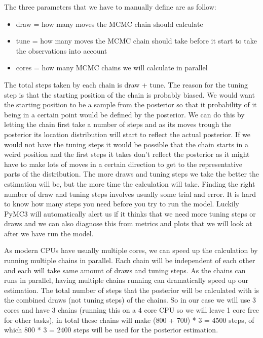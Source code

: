 \documentclass[12pt,a4paper,leqno]{report}
\theoremstyle{plain}
\theoremstyle{definition}
\theoremstyle{remark}
\begin{document}
The three parameters that we have to manually define are as follow:

\begin{itemize}
    \item draw = how many moves the MCMC chain should calculate
    \item tune = how many moves the MCMC chain should take before it start to
    take the observations into account
    \item cores = how many MCMC chains we will calculate in parallel
\end{itemize}

The total steps taken by each chain is draw + tune. The reason for the tuning step is
that the starting position of the chain is probably biased. We would want the starting
position to be a sample from the posterior so that it probability of it being in a certain
point would be defined by the posterior. We can do this by letting the chain first take
a number of steps and as its moves trough the posterior its location distribution will start to
reflect the actual posterior. If we would not have the tuning steps it would be possible
that the chain starts in a weird position and the first steps it takes don't reflect the
posterior as it might have to make lots of moves in a certain direction to get to the
representative parts of the distribution. The more draws and tuning steps we take the
better the estimation will be, but the more time the calculation will take. Finding the
right number of draw and tuning steps involves usually some trial and error. It is
hard to know how many steps you need before you try to run the model. Luckily PyMC3 will
automatically alert us if it thinks that we need more tuning steps or draws and we can
also diagnose this from metrics and plots that we will look at after we have run the
model.

As modern CPUs have usually multiple cores, we can speed up the calculation by running
multiple chains in parallel. Each chain will be independent of each other and each will
take same amount of draws and tuning steps. As the chains can runs in parallel, having
multiple chains running can dramatically speed up our estimation. The total number of steps that
the posterior will be calculated with is the combined draws (not tuning steps) of the
chains. So in our case we will use 3 cores and have 3 chains (running this on a 4 core
CPU so we will leave 1 core free for other tasks), in total these chains will make (800 +
700) * 3 = 4500 steps, of which 800 * 3 = 2400 steps will be used for the posterior estimation.
\end{document}
